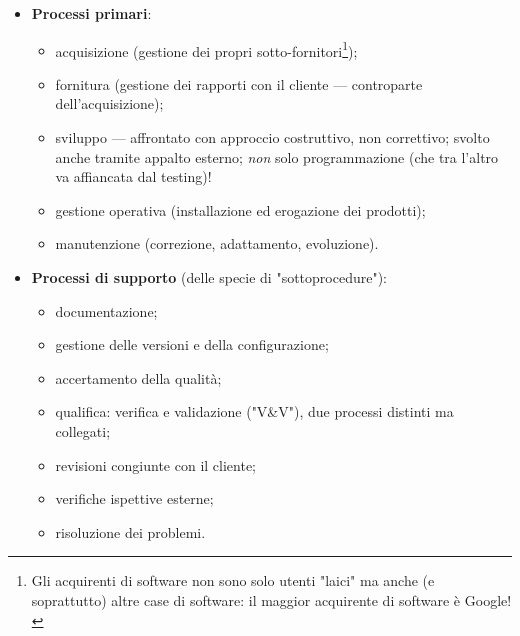 \documentclass[a4paper]{article}
\begin{document}
	\begin{itemize}
		
			
	\item \textbf{Processi primari}:
				
	\begin{itemize}
		
					
	\item acquisizione (gestione dei propri sotto-fornitori\footnote{Gli acquirenti di software non sono solo utenti "laici" ma anche (e soprattutto) altre case di software: il maggior acquirente di software è Google!});
					
	\item fornitura (gestione dei rapporti con il cliente --- controparte dell'acquisizione);
					
	\item sviluppo --- affrontato con approccio costruttivo, non correttivo; svolto anche tramite appalto esterno; \emph{non} solo programmazione (che tra l'altro va affiancata dal testing)!
					
	\item gestione operativa (installazione ed erogazione dei prodotti);
					
	\item manutenzione (correzione, adattamento, evoluzione).
				
	\end{itemize}

			
			
	\item \textbf{Processi di supporto} (delle specie di "sottoprocedure"):
				
	\begin{itemize}
		
					
	\item documentazione;
					
	\item gestione delle versioni e della configurazione;
					
	\item accertamento della qualità;
					
	\item qualifica: verifica e validazione ("V\&{}V"), due processi distinti ma collegati;
					
	\item revisioni congiunte con il cliente;
					
	\item verifiche ispettive esterne;
					
	\item risoluzione dei problemi.
				

\end{itemize}
\end{itemize}
\end{document}
